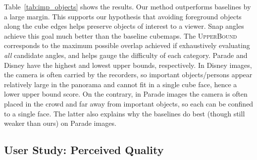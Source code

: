 Table~\ref{tab:imp_objects} shows the results.
Our method outperforms  baselines by a large margin.
This supports our hypothesis that avoiding foreground objects along the cube edges helps preserve objects of interest to a viewer.  Snap angles achieve this goal much better than the baseline cubemaps.
The \textsc{UpperBound} corresponds to the maximum possible overlap achieved if exhaustively evaluating \emph{all} candidate angles, and helps gauge the difficulty of each category.   Parade and Disney have the highest and lowest upper bounds, respectively.
In Disney images, the camera is often carried by the recorders, so important objects/persons appear relatively large in the panorama and cannot fit in a single cube face, hence a lower upper bound score.
On the contrary, in Parade images the camera is often placed in the crowd and far away from important objects, so each can be confined to a single face.
The latter also explains why the baselines do best (though still weaker than ours) on Parade images. 







\vspace{-10pt}
\subsection{User Study: Perceived Quality}\label{sec:human}








